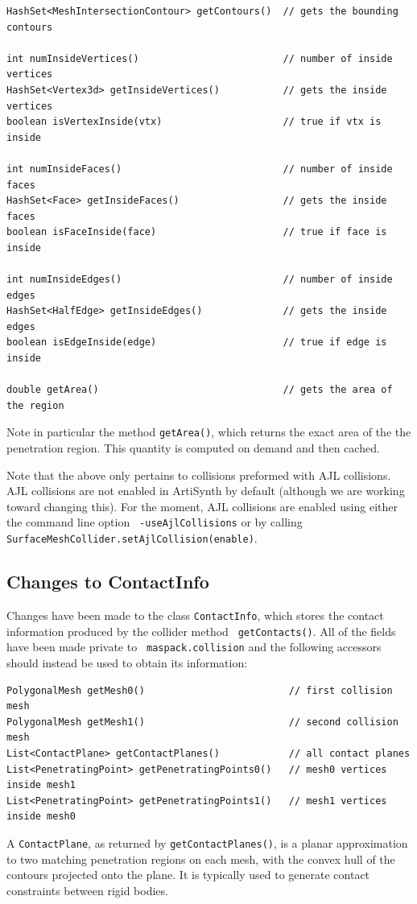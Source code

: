 \documentclass{article}
\begin{document}
%
\begin{lstlisting}[]
HashSet<MeshIntersectionContour> getContours()  // gets the bounding contours

int numInsideVertices()                         // number of inside vertices
HashSet<Vertex3d> getInsideVertices()           // gets the inside vertices
boolean isVertexInside(vtx)                     // true if vtx is inside

int numInsideFaces()                            // number of inside faces
HashSet<Face> getInsideFaces()                  // gets the inside faces
boolean isFaceInside(face)                      // true if face is inside

int numInsideEdges()                            // number of inside edges
HashSet<HalfEdge> getInsideEdges()              // gets the inside edges
boolean isEdgeInside(edge)                      // true if edge is inside

double getArea()                                // gets the area of the region
\end{lstlisting}
%

Note in particular the method {\tt getArea()}, which returns the exact
area of the the penetration region. This quantity is computed on
demand and then cached.

\begin{sideblock}
Note that the above only pertains to collisions preformed with AJL
collisions.  AJL collisions are not enabled in ArtiSynth by default
(although we are working toward changing this). For the moment, AJL
collisions are enabled using either the command line option {\tt
-useAjlCollisions} or by calling {\tt
SurfaceMeshCollider.setAjlCollision(enable)}.
\end{sideblock}

\subsection*{Changes to ContactInfo}

Changes have been made to the class {\tt ContactInfo}, which stores
the contact information produced by the collider method {\tt
getContacts()}. All of the fields have been made private to {\tt
maspack.collision} and the following accessors should instead be used
to obtain its information:
%
\begin{lstlisting}[]
PolygonalMesh getMesh0()                         // first collision mesh
PolygonalMesh getMesh1()                         // second collision mesh
List<ContactPlane> getContactPlanes()            // all contact planes
List<PenetratingPoint> getPenetratingPoints0()   // mesh0 vertices inside mesh1
List<PenetratingPoint> getPenetratingPoints1()   // mesh1 vertices inside mesh0
\end{lstlisting}
%
A {\tt ContactPlane}, as returned by {\tt getContactPlanes()}, is a
planar approximation to two matching penetration regions on each mesh,
with the convex hull of the contours projected onto the plane. It is
typically used to generate contact constraints between rigid bodies.
\end{document}
